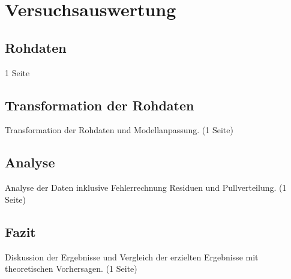 \section{Versuchsauswertung}
\subsection{Rohdaten}
1 Seite
\subsection{Transformation der Rohdaten}
Transformation der Rohdaten und Modellanpassung. (1 Seite)
\subsection{Analyse}
Analyse der Daten inklusive Fehlerrechnung Residuen und Pullverteilung. (1 Seite)

\subsection{Fazit} 
Diskussion der Ergebnisse und Vergleich der erzielten Ergebnisse mit theoretischen Vorhersagen. (1 Seite)